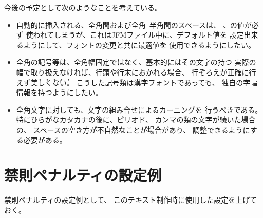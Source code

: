 今後の予定として次のようなことを考えている。
\begin{itemize}
\item 自動的に挿入される、全角間および全角--半角間のスペースは、
	{\bf{}}、{\bf{}}の値が必ず
	使われてしまうが、これはJFMファイル中に、デフォルト値を
	設定出来るようにして、フォントの変更と共に最適値を
	使用できるようにしたい。
\item 全角の記号等は、全角幅固定ではなく、基本的にはその文字の持つ
	実際の幅で取り扱えなければ、行頭や行末におかれる場合、
	行ぞろえが正確に行えず\. 美\. し\. く\. な\. い。
	こうした記号類は漢字フォントであっても、
	独自の字幅情報を持つようにしたい。
\item 全角文字に対しても、文字の組み合せによるカーニングを
	行うべきである。 特にひらがなカタカナの後に、ピリオド、
	カンマの類の文字が続いた場合の、
	スペースの空き方が不自然なことが場合があり、
	調整できるようにする必要がある。
\end{itemize}
%
\newpage
\appendix
\section{禁則ペナルティの設定例}
禁則ペナルティの設定例として、
このテキスト制作時に使用した設定を上げておく。

